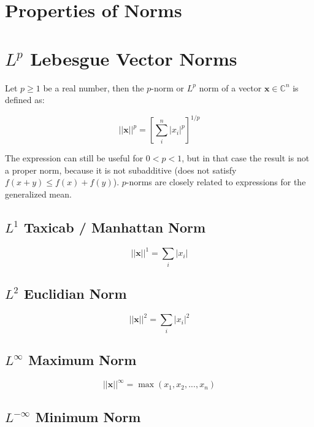 \section{Properties of Norms}

\section{$L^p$ Lebesgue Vector Norms}
\label{sec:lpnorms}

Let $p\geq1$ be a real number, then the $p$-norm or $L^p$ norm of a vector $\mathbf{x}\in\mathbb{C}^n$ is defined as:

\begin{equation}
||\mathbf{x}||^p = \left[ \sum^n_i |x_i|^p \right]^{1/p}
\end{equation}

The expression can still be useful for $0<p<1$, but in that case the result is not a proper norm, because it is not subadditive (does not satisfy $f(x+y) \leq f(x) + f(y)$). $p$-norms are closely related to expressions for the generalized mean.


\subsection{$L^{1}$ Taxicab / Manhattan Norm}
\begin{equation}
||\mathbf{x}||^1 = \sum_i |x_i|
\end{equation}


\subsection{$L^{2}$ Euclidian Norm}
\begin{equation}
||\mathbf{x}||^2 = \sum_i |x_i|^2
\end{equation}

\subsection{$L^{\infty}$ Maximum Norm} 

\begin{equation}
||\mathbf{x}||^{\infty} = \max(x_1,x_2,...,x_n)
\end{equation}

\subsection{$L^{-\infty}$ Minimum Norm} 

